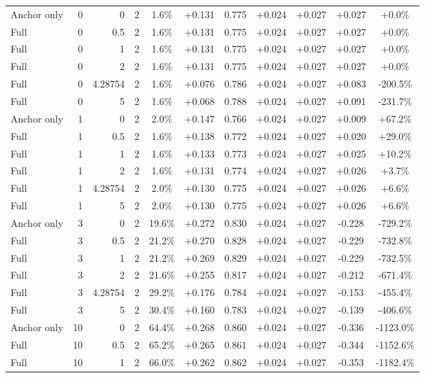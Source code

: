 \begin{table}[htbp]
\begin{tabular}{lrrrccccccc}
Anchor only & 0 & 0 & 2 & 1.6\% & +0.131 & 0.775 & +0.024 & +0.027 & +0.027 & +0.0\% \\
Full & 0 & 0.5 & 2 & 1.6\% & +0.131 & 0.775 & +0.024 & +0.027 & +0.027 & +0.0\% \\
Full & 0 & 1 & 2 & 1.6\% & +0.131 & 0.775 & +0.024 & +0.027 & +0.027 & +0.0\% \\
Full & 0 & 2 & 2 & 1.6\% & +0.131 & 0.775 & +0.024 & +0.027 & +0.027 & +0.0\% \\
Full & 0 & 4.28754 & 2 & 1.6\% & +0.076 & 0.786 & +0.024 & +0.027 & +0.083 & -200.5\% \\
Full & 0 & 5 & 2 & 1.6\% & +0.068 & 0.788 & +0.024 & +0.027 & +0.091 & -231.7\% \\
Anchor only & 1 & 0 & 2 & 2.0\% & +0.147 & 0.766 & +0.024 & +0.027 & +0.009 & +67.2\% \\
Full & 1 & 0.5 & 2 & 1.6\% & +0.138 & 0.772 & +0.024 & +0.027 & +0.020 & +29.0\% \\
Full & 1 & 1 & 2 & 1.6\% & +0.133 & 0.773 & +0.024 & +0.027 & +0.025 & +10.2\% \\
Full & 1 & 2 & 2 & 1.6\% & +0.131 & 0.774 & +0.024 & +0.027 & +0.026 & +3.7\% \\
Full & 1 & 4.28754 & 2 & 2.0\% & +0.130 & 0.775 & +0.024 & +0.027 & +0.026 & +6.6\% \\
Full & 1 & 5 & 2 & 2.0\% & +0.130 & 0.775 & +0.024 & +0.027 & +0.026 & +6.6\% \\
Anchor only & 3 & 0 & 2 & 19.6\% & +0.272 & 0.830 & +0.024 & +0.027 & -0.228 & -729.2\% \\
Full & 3 & 0.5 & 2 & 21.2\% & +0.270 & 0.828 & +0.024 & +0.027 & -0.229 & -732.8\% \\
Full & 3 & 1 & 2 & 21.2\% & +0.269 & 0.829 & +0.024 & +0.027 & -0.229 & -732.5\% \\
Full & 3 & 2 & 2 & 21.6\% & +0.255 & 0.817 & +0.024 & +0.027 & -0.212 & -671.4\% \\
Full & 3 & 4.28754 & 2 & 29.2\% & +0.176 & 0.784 & +0.024 & +0.027 & -0.153 & -455.4\% \\
Full & 3 & 5 & 2 & 30.4\% & +0.160 & 0.783 & +0.024 & +0.027 & -0.139 & -406.6\% \\
Anchor only & 10 & 0 & 2 & 64.4\% & +0.268 & 0.860 & +0.024 & +0.027 & -0.336 & -1123.0\% \\
Full & 10 & 0.5 & 2 & 65.2\% & +0.265 & 0.861 & +0.024 & +0.027 & -0.344 & -1152.6\% \\
Full & 10 & 1 & 2 & 66.0\% & +0.262 & 0.862 & +0.024 & +0.027 & -0.353 & -1182.4\% \\

\end{tabular}
\end{table}
